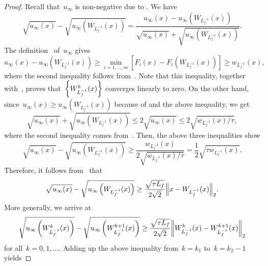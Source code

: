 \documentclass[../main]{subfiles}
\begin{document}
\begin{proof}
    Recall that~$u_\infty$ is non-negative due to .
    We have
    \begin{equation}
        \sqrt{u_\infty(x)} - \sqrt{u_\infty\left(W_{L_f^{-1}}(x)\right)} = \frac{u_\infty(x) - u_\infty\left(W_{L_f^{-1}}(x)\right)}{\sqrt{u_\infty(x)} + \sqrt{u_\infty\left(W_{L_f^{-1}}(x)\right)}}
        .\end{equation}
    The definition~ of~$u_\infty$ gives
    \begin{equation}
        u_\infty(x) - u_\infty\left(W_{L_f^{-1}}(x)\right) \ge \min_{i = 1, \dots, m} \left[F_i(x) - F_i\left(W_{L_f^{-1}}(x)\right)\right] \ge w_{L_f^{-1}}(x)
        ,\end{equation}
    where the second inequality follows from~.
    Note that this inequality, together with~, proves that~$\set*{W_{L_f^{-1}}^k(x)}$ converges linearly to zero.
    On the other hand, since~$u_\infty(x) \ge u_\infty\left(W_{L_f^{-1}}(x)\right)$ because of  and the above inequality, we get
    \begin{equation}
        \sqrt{u_\infty(x)} + \sqrt{u_\infty\left(W_{L_f^{-1}}(x)\right)} \le 2 \sqrt{u_\infty(x)} \le 2 \sqrt{w_{L_f^{-1}}(x) / \tau}
        ,\end{equation}
    where the second inequality comes from~.
    Then, the above three inequalities show
    \begin{equation}
        \sqrt{u_\infty(x)} - \sqrt{u_\infty\left(W_{L_f^{-1}}(x)\right)} \ge \frac{w_{L_f^{-1}}(x)}{2 \sqrt{w_{L_f^{-1}}(x) / \tau}} = \frac{1}{2} \sqrt{\tau w_{L_f^{-1}}(x)}
        .\end{equation}
    Therefore, it follows from~ that
    \begin{equation}
        \sqrt{u_\infty(x)} - \sqrt{u_\infty\left(W_{L_f^{-1}}(x)\right)} \ge \frac{\sqrt{\tau L_f}}{2 \sqrt{2}} \norm*{x - W_{L_f^{-1}}(x)}_2
        .\end{equation}
    More generally, we arrive at
    \begin{equation}
        \sqrt{u_\infty\left(W_{L_f^{-1}}^k(x)\right)} - \sqrt{u_\infty\left(W_{L_f^{-1}}^{k + 1}(x)\right)} \ge \frac{\sqrt{\tau L_f}}{2 \sqrt{2}} \norm*{W_{L_f^{-1}}^k(x) - W_{L_f^{-1}}^{k + 1}(x)}_2
    \end{equation}
    for all~$k = 0, 1, \dots$.
    Adding up the above inequality from~$k = k_1$ to~$k = k_2 - 1$ yields

\end{proof}
\end{document}
